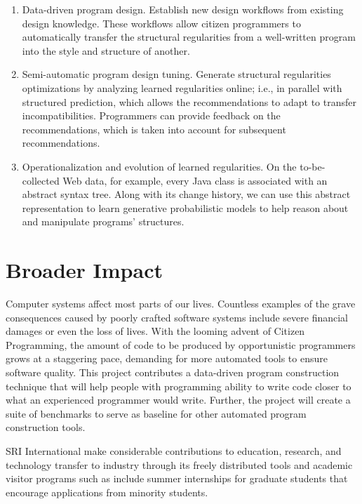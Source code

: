 \begin{enumerate}
	\item Data-driven program design. Establish new design workflows 
	from existing design knowledge. These workflows allow citizen 
	programmers to automatically transfer the structural regularities 
	from a well-written program into the style and structure of another.  
	\item Semi-automatic program design tuning. Generate structural 
	regularities optimizations by analyzing learned regularities online; 
	i.e., in parallel with structured prediction, which allows the 
	recommendations to adapt to transfer incompatibilities. Programmers 
	can provide feedback on the recommendations, which is taken into 
	account for subsequent recommendations.	
	\item Operationalization and evolution of learned regularities. 
	On the to-be-collected Web data, for example, every Java class is associated 
	with an abstract syntax tree. Along with its change history, we can use 
	this abstract representation to learn generative probabilistic models to help 
	reason about and manipulate programs' structures.
\end{enumerate}

\section*{Broader Impact} %
\label{sec:impact}

Computer systems affect most parts of our lives. Countless examples of 
the grave consequences caused by poorly crafted software systems include 
severe financial damages or even the loss of lives. With the looming 
advent of Citizen Programming, the amount of code to be produced by 
opportunistic programmers grows at a staggering pace, demanding for more 
automated tools to ensure software quality. This project contributes a 
data-driven program construction technique that will help people with 
programming ability to write code closer to what an experienced programmer 
would write. Further, the project will create a suite of benchmarks to 
serve as baseline for other automated program construction tools.

SRI International make considerable contributions to education, research, 
and technology transfer to industry through its freely distributed tools 
and academic visitor programs such as include summer internships for graduate 
students that encourage applications from minority students.